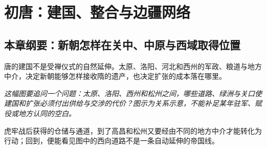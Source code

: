\chapter{初唐：建国、整合与边疆网络}
\label{ch:early-tang}
\section{本章纲要：新朝怎样在关中、中原与西域取得位置}
唐的建国不是受禅仪式的自然延伸。太原、洛阳、河北和西州的军政、粮道与地方中介，决定新朝能够怎样接收隋的遗产，也决定扩张的成本落在哪里。



\noindent\textit{这幅图要追问一个问题：太原、洛阳、西州和松州之间，哪些道路、绿洲与关口使建国和扩张必须付出供给与交涉的代价？图示为关系示意，不能补足某年驻军、赋役或地方认同的空白。}

\noindent 虎牢战后获得的仓储与通道，到了高昌和松州又要经由不同的地方中介才能转化为行动；回到，便能看见图中的西向道路不是一条自动延伸的帝国线。

